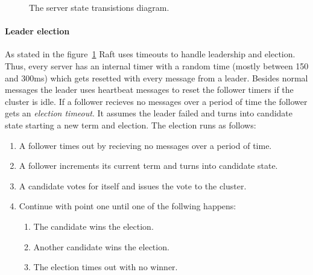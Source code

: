 \begin{figure}[ht]
  \centering
  \caption{The server state transistions diagram.~\cite{ongaro2014search}}
  \label{fig:serverstates}
\end{figure}

\paragraph{Leader election}
As stated in the figure~\ref{fig:serverstates} Raft uses timeouts to handle
leadership and election. Thus, every server has an internal timer with a
random time (mostly between 150 and 300ms) which gets resetted with
every message from a leader. Besides normal messages the leader uses
heartbeat messages to reset the follower timers if the cluster is idle.
If a follower recieves no messages over a period of time the
follower gets an \textit{election timeout}. It assumes the leader
failed and turns into candidate state starting a new term and
election. The election runs as follows:~\cite{ongaro2014search}

\begin{enumerate}
\item A follower times out by recieving no messages over a period of time.
\item A follower increments its current term and turns into candidate state.
\item A candidate votes for itself and issues the vote to the cluster.
\item Continue with point one until one of the follwing happens:
  \begin{enumerate}
  \item The candidate wins the election.
  \item Another candidate wins the election.
  \item The election times out with no winner.
  \end{enumerate}
\end{enumerate}

